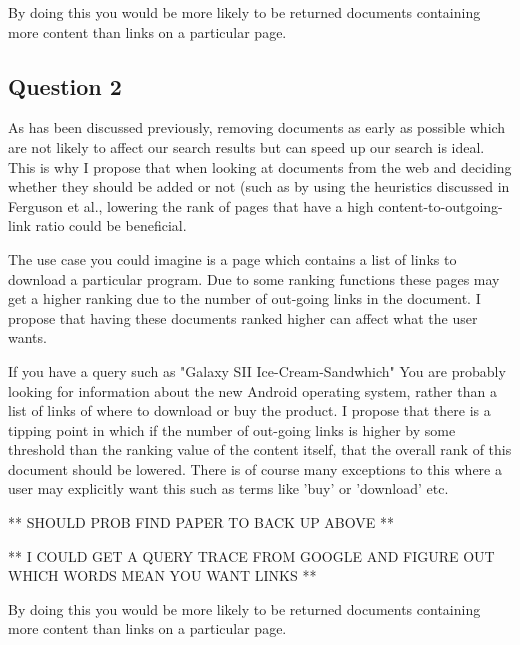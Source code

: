 \documentclass{acm_proc_article-sp}
\begin{document}
By doing this you would be more likely to be returned documents containing more content than links on a particular page.

\subsection{Question 2}
As has been discussed previously, removing documents as early as possible which are not likely to affect our search results but can speed up our search is ideal. This is why I propose that when looking at documents from the web and deciding whether they should be added or not (such as by using the heuristics discussed in Ferguson et al., lowering the rank of pages that have a high content-to-outgoing-link ratio could be beneficial.

The use case you could imagine is a page which contains a list of links to download a particular program. Due to some ranking functions these pages may get a higher ranking due to the number of out-going links in the document. I propose that having these documents ranked higher can affect what the user wants.

If you have a query such as "Galaxy SII Ice-Cream-Sandwhich" You are probably looking for information about the new Android operating system, rather than a list of links of where to download or buy the product. I propose that there is a tipping point in which if the number of out-going links is higher by some threshold than the ranking value of the content itself, that the overall rank of this document should be lowered. There is of course many exceptions to this where a user may explicitly want this such as terms like 'buy' or 'download' etc.

** SHOULD PROB FIND PAPER TO BACK UP ABOVE **

** I COULD GET A QUERY TRACE FROM GOOGLE AND FIGURE OUT WHICH WORDS MEAN YOU WANT LINKS **

By doing this you would be more likely to be returned documents containing more content than links on a particular page.
\end{document}
